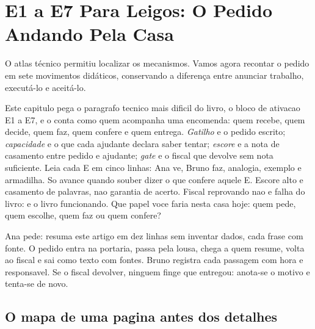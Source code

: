 \chapter{E1 a E7 Para Leigos: O Pedido Andando Pela Casa}

O atlas técnico permitiu localizar os mecanismos. Vamos agora recontar o pedido em sete movimentos didáticos, conservando a diferença entre anunciar trabalho, executá-lo e aceitá-lo.


\roteirodidatico
{Este capitulo pega o paragrafo tecnico mais dificil do livro, o bloco de ativacao E1 a E7, e o conta como quem acompanha uma encomenda: quem recebe, quem decide, quem faz, quem confere e quem entrega.}
{\emph{Gatilho} e o pedido escrito; \emph{capacidade} e o que cada ajudante declara saber tentar; \emph{escore} e a nota de casamento entre pedido e ajudante; \emph{gate} e o fiscal que devolve sem nota suficiente.}
{Leia cada E em cinco linhas: Ana ve, Bruno faz, analogia, exemplo e armadilha. So avance quando souber dizer o que confere aquele E.}
{Escore alto e casamento de palavras, nao garantia de acerto. Fiscal reprovando nao e falha do livro: e o livro funcionando.}
{Que papel voce faria nesta casa hoje: quem pede, quem escolhe, quem faz ou quem confere?}

{Ana pede: resuma este artigo em dez linhas sem inventar dados, cada frase com fonte. O pedido entra na portaria, passa pela lousa, chega a quem resume, volta ao fiscal e sai como texto com fontes. Bruno registra cada passagem com hora e responsavel. Se o fiscal devolver, ninguem finge que entregou: anota-se o motivo e tenta-se de novo.}

\section{O mapa de uma pagina antes dos detalhes}

